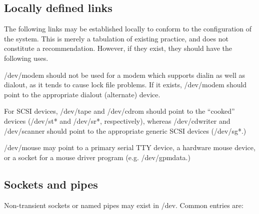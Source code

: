 \subsection{Locally defined links}

The following links may be established locally to conform to the
configuration of the system.  This is merely a tabulation of existing
practice, and does not constitute a recommendation.  However, if they
exist, they should have the following uses.

\begin{nodelist}
\end{nodelist}

\noindent
{\file /dev/modem} should not be used for a modem which supports
dialin as well as dialout, as it tends to cause lock file problems.
If it exists, {\file /dev/modem} should point to the appropriate
dialout (alternate) device.

For SCSI devices, {\file /dev/tape} and {\file /dev/cdrom} should
point to the ``cooked'' devices ({\file /dev/st*} and {\file
/dev/sr*}, respectively), whereas {\file /dev/cdwriter} and {\file
/dev/scanner} should point to the appropriate generic SCSI devices
({\file /dev/sg*}.)

{\file /dev/mouse} may point to a primary serial TTY device, a
hardware mouse device, or a socket for a mouse driver program
(e.g. {\file /dev/gpmdata}.)

\subsection{Sockets and pipes}

Non-transient sockets or named pipes may exist in {\file /dev}.
Common entries are:

\begin{nodelist}
\end{nodelist}



